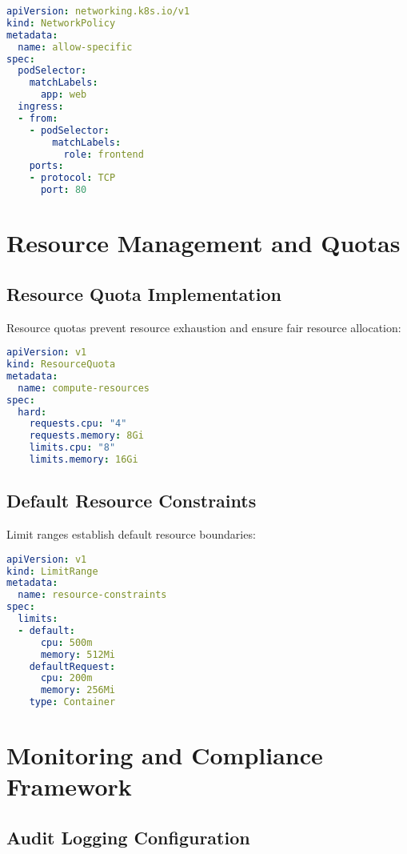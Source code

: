 \documentclass[PMO,lsstdraft,authoryear,toc]{lsstdoc}
\begin{document}
\begin{lstlisting}[language=yaml]
apiVersion: networking.k8s.io/v1
kind: NetworkPolicy
metadata:
  name: allow-specific
spec:
  podSelector:
    matchLabels:
      app: web
  ingress:
  - from:
    - podSelector:
        matchLabels:
          role: frontend
    ports:
    - protocol: TCP
      port: 80
\end{lstlisting}

\section{Resource Management and Quotas}

\subsection{Resource Quota Implementation}

Resource quotas prevent resource exhaustion and ensure fair resource allocation:

\begin{lstlisting}[language=yaml]
apiVersion: v1
kind: ResourceQuota
metadata:
  name: compute-resources
spec:
  hard:
    requests.cpu: "4"
    requests.memory: 8Gi
    limits.cpu: "8"
    limits.memory: 16Gi
\end{lstlisting}

\subsection{Default Resource Constraints}

Limit ranges establish default resource boundaries:

\begin{lstlisting}[language=yaml]
apiVersion: v1
kind: LimitRange
metadata:
  name: resource-constraints
spec:
  limits:
  - default:
      cpu: 500m
      memory: 512Mi
    defaultRequest:
      cpu: 200m
      memory: 256Mi
    type: Container
\end{lstlisting}

\section{Monitoring and Compliance Framework}

\subsection{Audit Logging Configuration}
\end{document}
